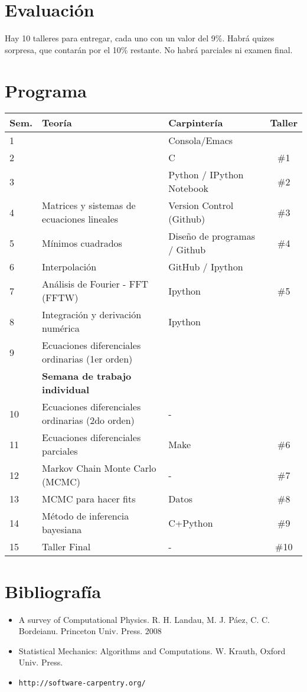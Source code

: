 \documentclass[12pt]{article}
\begin{document}
\section*{Evaluaci\'on}
Hay 10 talleres para entregar, cada uno con un valor del 9\%. Habr\'a
quizes sorpresa, que contar\'an por el 10\% restante. No habr\'a
parciales ni examen final. 

 
\section*{Programa}

\begin{center}
\begin{tabular}{|l|l|l|c|}
\hline
Sem. & Teor\'ia & Carpinter\'ia & Taller \\\hline
1 & 	&Consola/Emacs &\\
2 & 	&C  & \#1\\
3 & 	&Python / IPython Notebook & \#2\\
4 & Matrices y sistemas de ecuaciones lineales  & Version Control (Github) &\#3\\
5 & M\'inimos cuadrados & Dise\~no de programas / Github& \#4\\
6 & Interpolaci\'on & GitHub / Ipython& \\
7 & An\'alisis de Fourier - FFT  (FFTW)&  Ipython & \#5 \\
8 & Integraci\'on y derivaci\'on num\'erica & Ipython &\\
9 & Ecuaciones diferenciales ordinarias (1er orden)& &\\
 & {\bf Semana de trabajo individual} & &\\
10 & Ecuaciones diferenciales ordinarias (2do orden)&  - & \\
11 & Ecuaciones diferenciales parciales &  Make & \#6\\
12 & Markov Chain Monte Carlo (MCMC)&  - & \#7\\
13 & MCMC para hacer fits & Datos & \#8\\
14 & M\'etodo de inferencia bayesiana & C+Python& \#9\\
15 & Taller Final & - & \#10\\
\hline
\end{tabular}
\end{center}


\section*{Bibliograf\'ia}
\begin{itemize}
\item
A survey of Computational Physics. R. H. Landau, M. J. P\'aez, C. C.
Bordeianu. Princeton Univ. Press. 2008 
\item
Statistical Mechanics: Algorithms and Computations. W. Krauth, Oxford Univ. Press. 
\item\verb"http://software-carpentry.org/"
\end{itemize}

 
\end{document}
